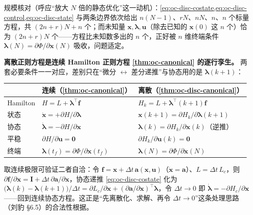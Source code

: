 \noindent 规模核对（呼应“放大 $N$ 倍的静态优化”这一动机）：\cref{eq:oc-disc-costate,eq:oc-disc-control,eq:oc-disc-state} 与两条边界依次给出 $n(N-1)$、$rN$、$nN$、$n$、$n$ 个标量方程，共 $(2n+r)N+n$ 个；而未知量 $\mathbf x,\boldsymbol\lambda,\mathbf u$（除去已知的 $\mathbf x(0)$ 这 $n$ 个）恰为 $(2n+r)N$ 个——方程比未知数多出的 $n$ 个，正好被 $n$ 维终端条件 $\boldsymbol\lambda(N)=\partial\Phi/\partial\mathbf x(N)$ 吸收，问题适定。

\begin{insight}
\textbf{离散正则方程是连续 Hamilton 正则方程 \cref{thm:oc-canonical} 的逐行孪生。}\;
两套必要条件一一对应，差别只在“微分 $\leftrightarrow$ 差分递推”与协态用的是 $\boldsymbol\lambda(k+1)$：
\begin{center}
\small
\begin{tabular}{lll}
\toprule
 & 连续（\cref{thm:oc-canonical}）& 离散（\cref{thm:oc-disc-canonical}）\\
\midrule
Hamilton & $H=L+\boldsymbol\lambda^\top\mathbf f$ & $H_k=L+\boldsymbol\lambda^\top(k{+}1)\mathbf f$ \\
状态 & $\dot{\mathbf x}=+\partial H/\partial\boldsymbol\lambda$ & $\mathbf x(k{+}1)=\partial H_k/\partial\boldsymbol\lambda(k{+}1)$ \\
协态 & $\dot{\boldsymbol\lambda}=-\partial H/\partial\mathbf x$ & $\boldsymbol\lambda(k)=\partial H_k/\partial\mathbf x(k)$（逆推）\\
平稳 & $\partial H/\partial\mathbf u=\mathbf0$ & $\partial H_k/\partial\mathbf u(k)=\mathbf0$ \\
终端 & $\boldsymbol\lambda(t_f)=\partial\Phi/\partial\mathbf x(t_f)$ & $\boldsymbol\lambda(N)=\partial\Phi/\partial\mathbf x(N)$ \\
\bottomrule
\end{tabular}
\end{center}
取连续极限可验证二者自洽：令 $\mathbf f=\mathbf x+\Delta t\,\mathbf a(\mathbf x,\mathbf u)$（$\dot{\mathbf x}=\mathbf a$）、$L=\Delta t\,L_c$，则 $\partial\mathbf f/\partial\mathbf x=\mathbf I+\Delta t\,\partial\mathbf a/\partial\mathbf x$，协态递推 \cref{eq:oc-disc-costate} 化为 $\big(\boldsymbol\lambda(k)-\boldsymbol\lambda(k+1)\big)/\Delta t=\partial L_c/\partial\mathbf x+(\partial\mathbf a/\partial\mathbf x)^\top\boldsymbol\lambda$，令 $\Delta t\to0$ 即 $\dot{\boldsymbol\lambda}=-\partial H_c/\partial\mathbf x$——回到连续协态方程。这正是“先离散化、求解、再令 $\Delta t\to0$”这条处理思路（刘豹 §6.5）的合法性根据。
\end{insight}

